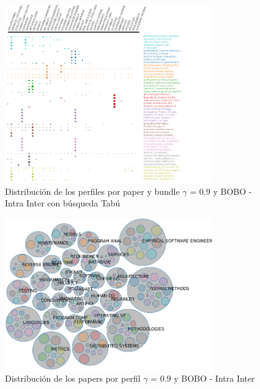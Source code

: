 \begin{figure}[H]
  \centering
    \includegraphics[width=0.8\textwidth]{resultados/papers/BOBO/INTRA_INTER/gamma-with-local-09.png}
  \caption{Distribución de los perfiles por paper y bundle $\gamma$ = $0.9$ y BOBO - Intra Inter con búsqueda Tabú}
  \label{res:img-papers-gamma09-bobo-intra-inter-tabu}
\end{figure}

\begin{figure}[H]
  \centering
    \includegraphics[width=0.8\textwidth]{resultados/papers/BOBO/INTRA_INTER/bubbles-gamma-09.png}
  \caption{Distribución de los papers por perfil $\gamma$ = $0.9$ y BOBO - Intra Inter}
  \label{res:img-papers-bubbles-gamma09-bobo-intra-inter}
\end{figure}


